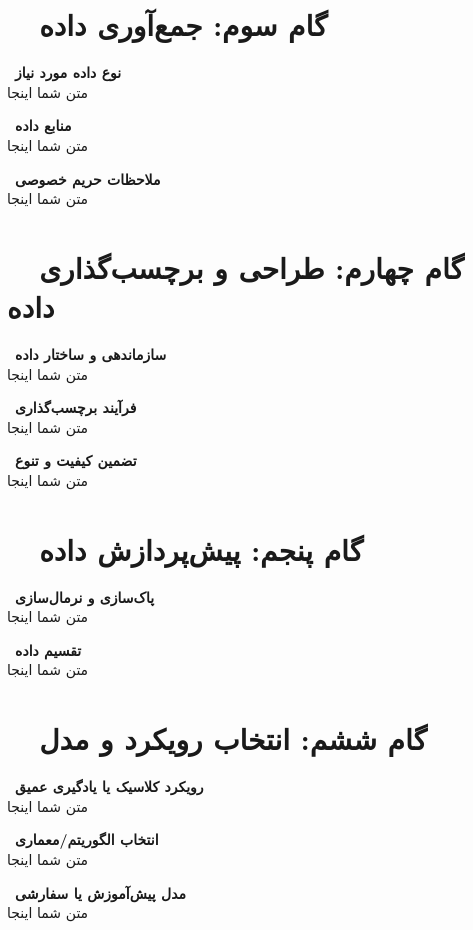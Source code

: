 \documentclass[12pt, a4paper]{article}
\newcommand{\field}[2]{%
    \noindent\textbf{\textcolor{primary}{\faChevronLeft\ #1}}\\[0.15cm]
    #2\par\vspace{0.6cm}
}
\begin{document}
\newpage
\section[گام سوم: جمع‌آوری داده]{\faDatabase\ \ گام سوم: جمع‌آوری داده}
\begin{stepbox}

\field{نوع داده مورد نیاز}{متن شما اینجا}

\field{منابع داده}{متن شما اینجا}

\field{ملاحظات حریم خصوصی}{متن شما اینجا}

\end{stepbox}

\newpage
\section[گام چهارم: طراحی و برچسب‌گذاری داده]{\faTags\ \ گام چهارم: طراحی و برچسب‌گذاری داده}
\begin{stepbox}

\field{سازماندهی و ساختار داده}{متن شما اینجا}

\field{فرآیند برچسب‌گذاری}{متن شما اینجا}

\field{تضمین کیفیت و تنوع}{متن شما اینجا}

\end{stepbox}

\newpage
\section[گام پنجم: پیش‌پردازش داده]{\faFilter\ \ گام پنجم: پیش‌پردازش داده}
\begin{stepbox}

\field{پاک‌سازی و نرمال‌سازی}{متن شما اینجا}

\field{تقسیم داده}{متن شما اینجا}

\end{stepbox}

\newpage
\section[گام ششم: انتخاب رویکرد و مدل]{\faBrain\ \ گام ششم: انتخاب رویکرد و مدل}
\begin{stepbox}

\field{رویکرد کلاسیک یا یادگیری عمیق}{متن شما اینجا}

\field{انتخاب الگوریتم/معماری}{متن شما اینجا}

\field{مدل پیش‌آموزش یا سفارشی}{متن شما اینجا}

\end{stepbox}
\end{document}
